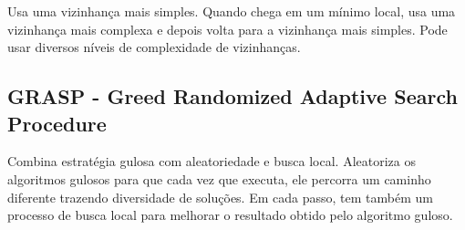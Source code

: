 Usa uma vizinhança mais simples. Quando chega em um mínimo local, usa uma vizinhança mais complexa e depois volta para a vizinhança mais simples. Pode usar diversos níveis de complexidade de vizinhanças.

\subsection{GRASP - Greed Randomized Adaptive Search Procedure}

Combina estratégia gulosa com aleatoriedade e busca local. Aleatoriza os algoritmos gulosos para que cada vez que executa, ele percorra um caminho diferente trazendo diversidade de soluções. Em cada passo, tem também um processo de busca local para melhorar o resultado obtido pelo algoritmo guloso.
